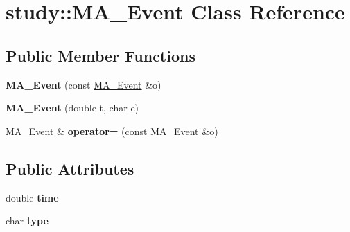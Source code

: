 \hypertarget{classstudy_1_1_m_a___event}{\section{study\+:\+:M\+A\+\_\+\+Event Class Reference}
\label{classstudy_1_1_m_a___event}
}
\subsection*{Public Member Functions}
\begin{DoxyCompactItemize}
\item 
\hypertarget{classstudy_1_1_m_a___event_a1dfc926f57bcd61fce29e0def8c7f1f5}{{\bfseries M\+A\+\_\+\+Event} (const \hyperlink{classstudy_1_1_m_a___event}{M\+A\+\_\+\+Event} \&o)}\label{classstudy_1_1_m_a___event_a1dfc926f57bcd61fce29e0def8c7f1f5}

\item 
\hypertarget{classstudy_1_1_m_a___event_a0e2cf6868d6571cd02b1300b71a9ac29}{{\bfseries M\+A\+\_\+\+Event} (double t, char e)}\label{classstudy_1_1_m_a___event_a0e2cf6868d6571cd02b1300b71a9ac29}

\item 
\hypertarget{classstudy_1_1_m_a___event_a31a6085e3cd36a1504c92b3b0d6844c9}{\hyperlink{classstudy_1_1_m_a___event}{M\+A\+\_\+\+Event} \& {\bfseries operator=} (const \hyperlink{classstudy_1_1_m_a___event}{M\+A\+\_\+\+Event} \&o)}\label{classstudy_1_1_m_a___event_a31a6085e3cd36a1504c92b3b0d6844c9}

\end{DoxyCompactItemize}
\subsection*{Public Attributes}
\begin{DoxyCompactItemize}
\item 
\hypertarget{classstudy_1_1_m_a___event_aa84a84a7380230444d9500f91d192a60}{double {\bfseries time}}\label{classstudy_1_1_m_a___event_aa84a84a7380230444d9500f91d192a60}

\item 
\hypertarget{classstudy_1_1_m_a___event_af28d2421d55747bf9a80d796ab15bac8}{char {\bfseries type}}\label{classstudy_1_1_m_a___event_af28d2421d55747bf9a80d796ab15bac8}

\end{DoxyCompactItemize}
